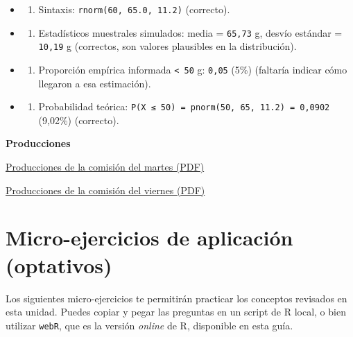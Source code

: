 \documentclass[
  spanish,
  letterpaper,
  DIV=11,
  numbers=noendperiod]{scrreprt}
\providecommand{\tightlist}{%
  \setlength{\itemsep}{0pt}\setlength{\parskip}{0pt}}
\begin{document}
\begin{itemize}
  \begin{itemize}
  \tightlist
  \item
    \begin{enumerate}
    \def\labelenumi{\alph{enumi})}
    \tightlist
    \item
      Sintaxis: \texttt{rnorm(60,\ 65.0,\ 11.2)} (correcto).
    \end{enumerate}
  \item
    \begin{enumerate}
    \def\labelenumi{\alph{enumi})}
    \setcounter{enumi}{1}
    \tightlist
    \item
      Estadísticos muestrales simulados: media = \texttt{65,73} g,
      desvío estándar = \texttt{10,19} g (correctos, son valores
      plausibles en la distribución).
    \end{enumerate}
  \item
    \begin{enumerate}
    \def\labelenumi{\alph{enumi})}
    \setcounter{enumi}{2}
    \tightlist
    \item
      Proporción empírica informada \texttt{\textless{}\ 50} g:
      \texttt{0,05} (5\%) (faltaría indicar cómo llegaron a esa
      estimación).
    \end{enumerate}
  \item
    \begin{enumerate}
    \def\labelenumi{\alph{enumi})}
    \setcounter{enumi}{3}
    \tightlist
    \item
      Probabilidad teórica:
      \texttt{P(X\ ≤\ 50)\ =\ pnorm(50,\ 65,\ 11.2)\ =\ 0,0902} (9,02\%)
      (correcto).
    \end{enumerate}
  \end{itemize}
\end{itemize}

\textbf{Producciones}

\href{./ACTIVIDADES\%20CLASE/NORMAL/normal.pdf}{Producciones de la
comisión del martes (PDF)}

\href{./ACTIVIDADES\%20CLASE/NORMAL/normal2.pdf}{Producciones de la
comisión del viernes (PDF)}

\section{Micro-ejercicios de aplicación
(optativos)}\label{micro-ejercicios-de-aplicaciuxf3n-optativos-4}

Los siguientes micro-ejercicios te permitirán practicar los conceptos
revisados en esta unidad. Puedes copiar y pegar las preguntas en un
script de R local, o bien utilizar \texttt{webR}, que es la versión
\emph{online} de R, disponible en esta guía.
\end{document}
